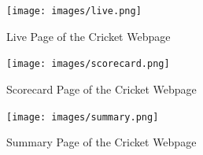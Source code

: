 \documentclass[a4paper,12pt]{article}
\begin{document}
\begin{figure}[h!]
\centering
\texttt{[image: images/live.png]}
\caption{Live Page of the Cricket Webpage}
\label{live}
\end{figure}

\vspace{1.5cm}

\begin{figure}[h!]
\centering
\texttt{[image: images/scorecard.png]}
\caption{Scorecard Page of the Cricket Webpage}
\label{scorecard}
\end{figure}

\begin{figure}[h!]
\centering
\texttt{[image: images/summary.png]}
\caption{Summary Page of the Cricket Webpage}
\label{summary}
\end{figure}  
\end{document}

